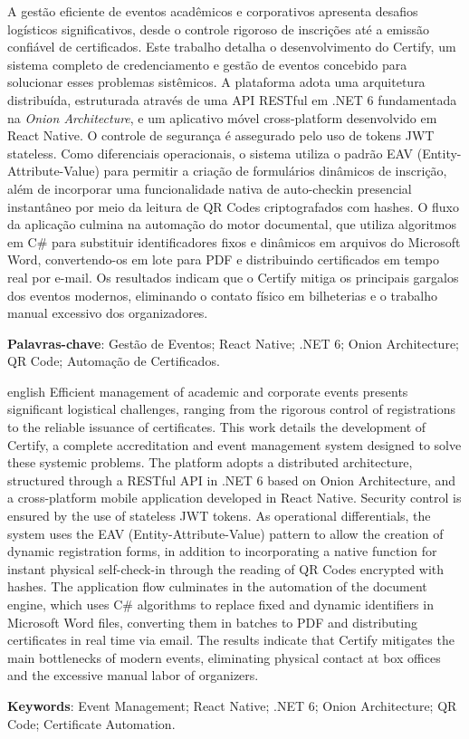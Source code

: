 \setlength{\absparsep}{18pt}
\begin{resumo}
A gestão eficiente de eventos acadêmicos e corporativos apresenta desafios logísticos significativos, desde o controle rigoroso de inscrições até a emissão confiável de certificados. Este trabalho detalha o desenvolvimento do Certify, um sistema completo de credenciamento e gestão de eventos concebido para solucionar esses problemas sistêmicos. A plataforma adota uma arquitetura distribuída, estruturada através de uma API RESTful em .NET 6 fundamentada na \textit{Onion Architecture}, e um aplicativo móvel cross-platform desenvolvido em React Native. O controle de segurança é assegurado pelo uso de tokens JWT stateless. Como diferenciais operacionais, o sistema utiliza o padrão EAV (Entity-Attribute-Value) para permitir a criação de formulários dinâmicos de inscrição, além de incorporar uma funcionalidade nativa de auto-checkin presencial instantâneo por meio da leitura de QR Codes criptografados com hashes. O fluxo da aplicação culmina na automação do motor documental, que utiliza algoritmos em C\# para substituir identificadores fixos e dinâmicos em arquivos do Microsoft Word, convertendo-os em lote para PDF e distribuindo certificados em tempo real por e-mail. Os resultados indicam que o Certify mitiga os principais gargalos dos eventos modernos, eliminando o contato físico em bilheterias e o trabalho manual excessivo dos organizadores.

\textbf{Palavras-chave}: Gestão de Eventos; React Native; .NET 6; Onion Architecture; QR Code; Automação de Certificados.
\end{resumo}

\begin{resumo}[Abstract]
 \begin{otherlanguage*}{english}
Efficient management of academic and corporate events presents significant logistical challenges, ranging from the rigorous control of registrations to the reliable issuance of certificates. This work details the development of Certify, a complete accreditation and event management system designed to solve these systemic problems. The platform adopts a distributed architecture, structured through a RESTful API in .NET 6 based on Onion Architecture, and a cross-platform mobile application developed in React Native. Security control is ensured by the use of stateless JWT tokens. As operational differentials, the system uses the EAV (Entity-Attribute-Value) pattern to allow the creation of dynamic registration forms, in addition to incorporating a native function for instant physical self-check-in through the reading of QR Codes encrypted with hashes. The application flow culminates in the automation of the document engine, which uses C\# algorithms to replace fixed and dynamic identifiers in Microsoft Word files, converting them in batches to PDF and distributing certificates in real time via email. The results indicate that Certify mitigates the main bottlenecks of modern events, eliminating physical contact at box offices and the excessive manual labor of organizers.

\textbf{Keywords}: Event Management; React Native; .NET 6; Onion Architecture; QR Code; Certificate Automation.
 \end{otherlanguage*}
\end{resumo}
